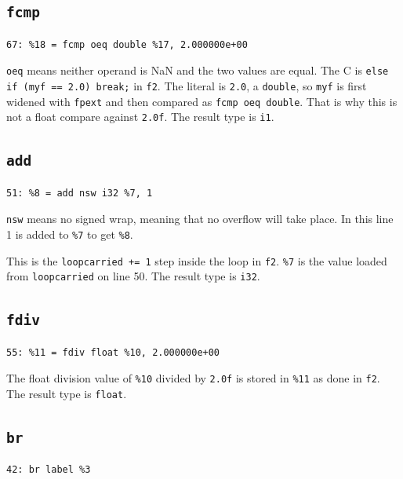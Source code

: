 \documentclass[11pt,a4paper]{article}
\begin{document}
\subsection*{\texttt{fcmp}}

\begin{lstlisting}
67: %18 = fcmp oeq double %17, 2.000000e+00
\end{lstlisting}

\texttt{oeq} means neither operand is NaN and the two values are equal.
The C is \texttt{else if (myf == 2.0) break;} in \texttt{f2}. The
literal is \texttt{2.0}, a \texttt{double}, so \texttt{myf} is first
widened with \texttt{fpext} and then compared as
\texttt{fcmp oeq double}. That is why this is not a float compare
against \texttt{2.0f}. The result type is \texttt{i1}.

\subsection*{\texttt{add}}

\begin{lstlisting}
51: %8 = add nsw i32 %7, 1
\end{lstlisting}

\texttt{nsw} means no signed wrap, meaning that no overflow will take place. In
this line 1 is added to \texttt{\%7} to get \texttt{\%8}.

This is the \texttt{loopcarried += 1} step inside the loop in \texttt{f2}.
\texttt{\%7} is the value loaded from \texttt{loopcarried} on line 50. The result
type is \texttt{i32}.

\subsection*{\texttt{fdiv}}

\begin{lstlisting}
55: %11 = fdiv float %10, 2.000000e+00
\end{lstlisting}

The float division value of \texttt{\%10} divided by \texttt{2.0f} is stored in
\texttt{\%11} as done in \texttt{f2}. The result type is \texttt{float}.

\subsection*{\texttt{br}}

\begin{lstlisting}
42: br label %3
\end{lstlisting}
\end{document}
